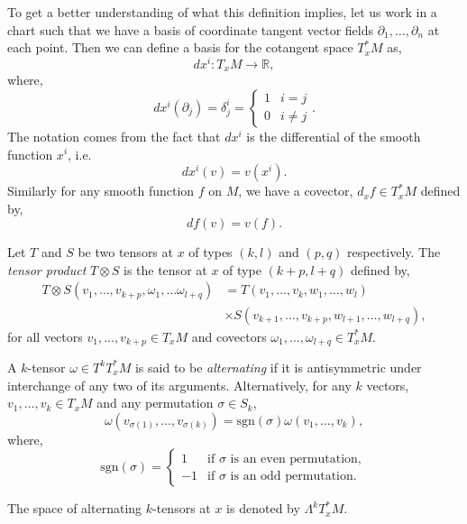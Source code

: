 \documentclass[12pt,a4paper]{article}
\begin{document}
To get a better understanding of what this definition implies, let us work in a chart such that we have a basis of coordinate tangent vector fields $\partial_1,\ldots,\partial_n$ at each point. Then we can define a basis for the cotangent space $T^*_xM$ as,
\[
dx^i:T_xM\to\mathbb{R},
\]
where,
\[
dx^i(\partial_j)=\delta^i_j=\begin{cases}
1 & i=j\\
0 & i\neq j
\end{cases}.
\]
The notation comes from the fact that $dx^i$ is the differential of the smooth function $x^i$, i.e.
\[
dx^i(v)=v(x^i).
\]
Similarly for any smooth function $f$ on $M$, we have a covector, $d_xf\in T^*_xM$ defined by,
\[
df(v)=v(f).
\]
\begin{definition}
Let $T$ and $S$ be two tensors at $x$ of types $(k,l)$ and $(p,q)$ respectively. The \textit{tensor product} $T\otimes S$ is the tensor at $x$ of type $(k+p,l+q)$ defined by,
\begin{align*}
T\otimes S(v_1,\ldots,v_{k+p},\omega_1,\ldots\omega_{l+q})&=T\left(v_1,\ldots,v_k,w_1,\ldots,w_l \right)\\
&\times S\left(v_{k+1},\ldots,v_{k+p},w_{l+1},\ldots,w_{l+q} \right),
\end{align*}
for all vectors $v_1,\ldots,v_{k+p}\in T_xM$ and covectors $\omega_1,\ldots,\omega_{l+q}\in T^*_xM$.
\end{definition}
\begin{definition}
A $k$-tensor $\omega\in T^kT^*_xM$ is said to be \textit{alternating} if it is antisymmetric under interchange of any two of its arguments. Alternatively, for any $k$ vectors, $v_1,\ldots,v_k\in T_xM$ and any permutation $\sigma\in S_k$,
\[
\omega(v_{\sigma(1)},\ldots,v_{\sigma(k)})=\mathrm{sgn}(\sigma)\omega(v_1,\ldots,v_k),
\]
where,
\[
\mathrm{sgn}(\sigma)=\begin{cases}
1 & \text{if }\sigma\text{ is an even permutation},\\
-1 & \text{if }\sigma\text{ is an odd permutation}.
\end{cases}
\]
\end{definition}
The space of alternating $k$-tensors at $x$ is denoted by $\Lambda^kT^*_xM$.
\end{document}
